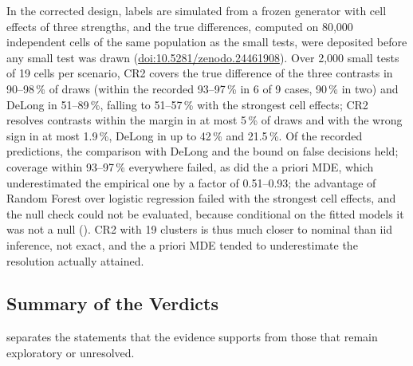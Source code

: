 \documentclass[11pt,a4paper]{article}
\begin{document}
In the corrected design, labels are simulated from a frozen generator with cell effects of three strengths, and the true differences, computed on 80{,}000 independent cells of the same population as the small tests, were deposited before any small test was drawn (\href{https://doi.org/10.5281/zenodo.24461908}{doi:10.5281/zenodo.24461908}). Over 2{,}000 small tests of 19 cells per scenario, CR2 covers the true difference of the three contrasts in 90--98\,\% of draws (within the recorded 93--97\,\% in 6 of 9 cases, 90\,\% in two) and DeLong in 51--89\,\%, falling to 51--57\,\% with the strongest cell effects; CR2 resolves contrasts within the margin in at most 5\,\% of draws and with the wrong sign in at most 1.9\,\%, DeLong in up to 42\,\% and 21.5\,\%. Of the recorded predictions, the comparison with DeLong and the bound on false decisions held; coverage within 93--97\,\% everywhere failed, as did the a priori MDE, which underestimated the empirical one by a factor of 0.51--0.93; the advantage of Random Forest over logistic regression failed with the strongest cell effects, and the null check could not be evaluated, because conditional on the fitted models it was not a null (). CR2 with 19 clusters is thus much closer to nominal than iid inference, not exact, and the a priori MDE tended to underestimate the resolution actually attained.

\subsection{Summary of the Verdicts}
\label{sec:verdicts}

 separates the statements that the evidence supports from those that remain exploratory or unresolved.
\end{document}
